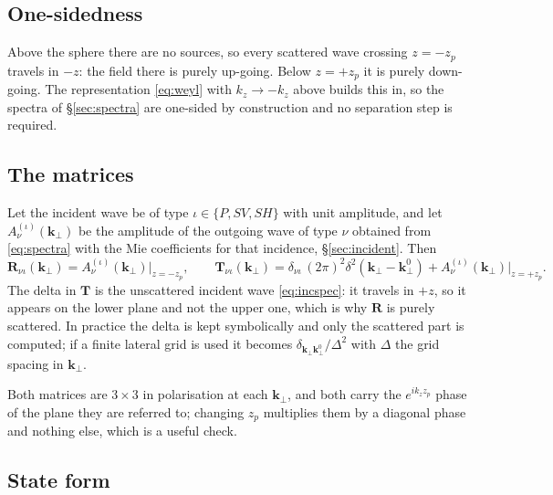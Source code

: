 \documentclass[11pt,a4paper]{article}
\newcommand{\bR}{\mathbf{R}}
\newcommand{\bT}{\mathbf{T}}
\newcommand{\bk}{\mathbf{k}}
\newcommand{\kperp}{\bk_\perp}
\begin{document}
\subsection{One-sidedness}

Above the sphere there are no sources, so every scattered wave crossing
$z = -z_p$ travels in $-z$: the field there is purely up-going.  Below
$z = +z_p$ it is purely down-going.  The representation \eqref{eq:weyl} with
$k_z \to -k_z$ above builds this in, so the spectra of \S\ref{sec:spectra} are
one-sided by construction and no separation step is required.

\subsection{The matrices}

Let the incident wave be of type $\iota\in\{P,SV,SH\}$ with unit amplitude, and
let $A^{(\iota)}_\nu(\kperp)$ be the amplitude of the outgoing wave of type
$\nu$ obtained from \eqref{eq:spectra} with the Mie coefficients for that
incidence, \S\ref{sec:incident}.  Then
\begin{equation}\label{eq:RT}
  \bR_{\nu\iota}(\kperp) = A^{(\iota)}_\nu(\kperp)\Big|_{z=-z_p},
  \qquad
  \bT_{\nu\iota}(\kperp) = \delta_{\nu\iota}\,(2\pi)^2\delta^2(\kperp-\kperp^0)
     + A^{(\iota)}_\nu(\kperp)\Big|_{z=+z_p} .
\end{equation}
The delta in $\bT$ is the unscattered incident wave \eqref{eq:incspec}: it
travels in $+z$, so it appears on the lower plane and not the upper one, which
is why $\bR$ is purely scattered.  In practice the delta is kept symbolically
and only the scattered part is computed; if a finite lateral grid is used it
becomes $\delta_{\kperp\kperp^0}/\Delta^2$ with $\Delta$ the grid spacing in
$\kperp$.

Both matrices are $3\times3$ in polarisation at each $\kperp$, and both carry
the $e^{ik_zz_p}$ phase of the plane they are referred to; changing $z_p$
multiplies them by a diagonal phase and nothing else, which is a useful check.

\subsection{State form}
\end{document}
